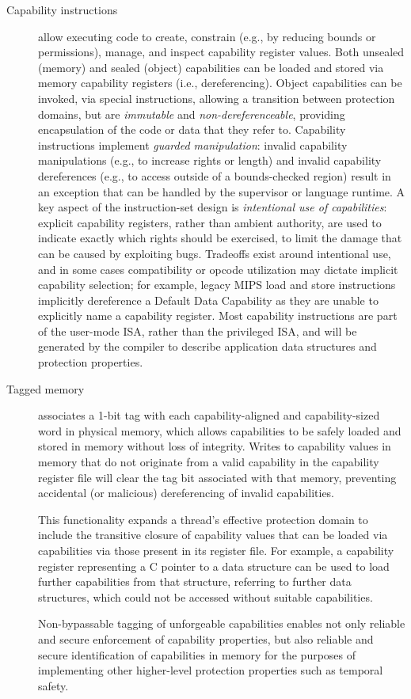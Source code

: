 \begin{description}
\item[Capability instructions] allow executing code to create, constrain (e.g., by reducing bounds or permissions), manage, and inspect capability register values.  Both unsealed (memory) and sealed (object) capabilities can be loaded and stored via memory capability registers (i.e., dereferencing).
Object capabilities can be invoked, via special instructions, allowing a transition between protection domains, but are {\em immutable} and {\em non-dereferenceable}, providing encapsulation of the code or data that they refer to.
  Capability instructions implement {\em guarded manipulation}: invalid capability manipulations (e.g., to increase rights or length) and invalid capability dereferences (e.g., to access outside of a bounds-checked region) result in an exception that can be handled by the supervisor or language runtime.
A key aspect of the instruction-set design is \textit{intentional use of
  capabilities}: explicit capability registers, rather than ambient
authority, are used to indicate exactly which rights should be exercised, to
limit the damage that can be caused by exploiting bugs.
Tradeoffs exist around intentional use, and in some cases compatibility or
opcode utilization may dictate implicit capability selection; for example,
legacy MIPS load and store instructions implicitly dereference a Default
Data Capability as they are unable to explicitly name a capability register.
Most capability instructions are part of the user-mode ISA, rather than the privileged ISA, and will be generated by the compiler to describe application data structures and protection properties.

\item[Tagged memory] associates a 1-bit tag with each capability-aligned and capability-sized word in physical memory, which allows capabilities to be safely loaded and stored in memory without loss of integrity.
  Writes to capability values in memory that do not originate from a valid capability in the capability register file will clear the tag bit associated with that memory, preventing accidental (or malicious) dereferencing
  of invalid capabilities.

This functionality expands a thread's effective protection domain to include the transitive closure of capability values that can be loaded via capabilities via those present in its register file.  For example, a capability register representing a C pointer to a data structure can be used to load further capabilities from that structure, referring to further data structures, which could not be accessed without suitable capabilities.

Non-bypassable tagging of unforgeable capabilities enables not only reliable
and secure enforcement of capability properties, but also reliable and secure
identification of capabilities in memory for the purposes of implementing
other higher-level protection properties such as temporal safety.
\end{description}

